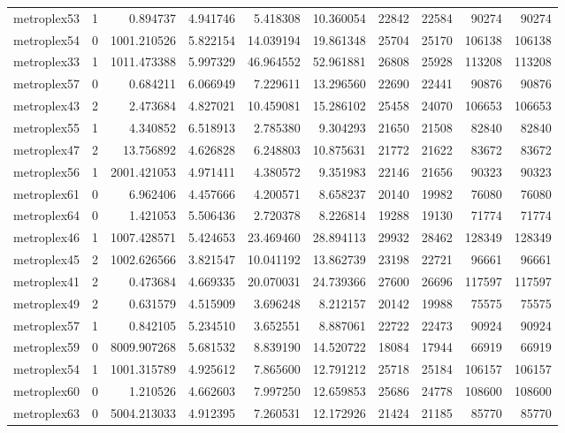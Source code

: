 \begin{longtable}{|l|r|r|r|r|r|r|r|r|r|}
metroplex53 & 1 & 0.894737 & 4.941746 & 5.418308 & 10.360054 & 22842 & 22584 & 90274 & 90274 \\
metroplex54 & 0 & 1001.210526 & 5.822154 & 14.039194 & 19.861348 & 25704 & 25170 & 106138 & 106138 \\
metroplex33 & 1 & 1011.473388 & 5.997329 & 46.964552 & 52.961881 & 26808 & 25928 & 113208 & 113208 \\
metroplex57 & 0 & 0.684211 & 6.066949 & 7.229611 & 13.296560 & 22690 & 22441 & 90876 & 90876 \\
metroplex43 & 2 & 2.473684 & 4.827021 & 10.459081 & 15.286102 & 25458 & 24070 & 106653 & 106653 \\
metroplex55 & 1 & 4.340852 & 6.518913 & 2.785380 & 9.304293 & 21650 & 21508 & 82840 & 82840 \\
metroplex47 & 2 & 13.756892 & 4.626828 & 6.248803 & 10.875631 & 21772 & 21622 & 83672 & 83672 \\
metroplex56 & 1 & 2001.421053 & 4.971411 & 4.380572 & 9.351983 & 22146 & 21656 & 90323 & 90323 \\
metroplex61 & 0 & 6.962406 & 4.457666 & 4.200571 & 8.658237 & 20140 & 19982 & 76080 & 76080 \\
metroplex64 & 0 & 1.421053 & 5.506436 & 2.720378 & 8.226814 & 19288 & 19130 & 71774 & 71774 \\
metroplex46 & 1 & 1007.428571 & 5.424653 & 23.469460 & 28.894113 & 29932 & 28462 & 128349 & 128349 \\
metroplex45 & 2 & 1002.626566 & 3.821547 & 10.041192 & 13.862739 & 23198 & 22721 & 96661 & 96661 \\
metroplex41 & 2 & 0.473684 & 4.669335 & 20.070031 & 24.739366 & 27600 & 26696 & 117597 & 117597 \\
metroplex49 & 2 & 0.631579 & 4.515909 & 3.696248 & 8.212157 & 20142 & 19988 & 75575 & 75575 \\
metroplex57 & 1 & 0.842105 & 5.234510 & 3.652551 & 8.887061 & 22722 & 22473 & 90924 & 90924 \\
metroplex59 & 0 & 8009.907268 & 5.681532 & 8.839190 & 14.520722 & 18084 & 17944 & 66919 & 66919 \\
metroplex54 & 1 & 1001.315789 & 4.925612 & 7.865600 & 12.791212 & 25718 & 25184 & 106157 & 106157 \\
metroplex60 & 0 & 1.210526 & 4.662603 & 7.997250 & 12.659853 & 25686 & 24778 & 108600 & 108600 \\
metroplex63 & 0 & 5004.213033 & 4.912395 & 7.260531 & 12.172926 & 21424 & 21185 & 85770 & 85770 \\

\end{longtable}
